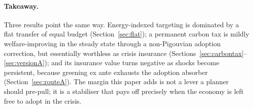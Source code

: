 \paragraph{Takeaway.} Three results point the same way. Energy-indexed targeting
is dominated by a flat transfer of equal budget (Section~\ref{sec:flat}); a
permanent carbon tax is mildly welfare-improving in the steady state through a
non-Pigouvian adoption correction, but essentially worthless as crisis insurance
(Sections~\ref{sec:carbontax}--\ref{sec:versionA}); and its insurance value turns
negative as shocks become persistent, because greening ex ante exhausts the
adoption absorber (Section~\ref{sec:routeA}). The margin this paper adds is not a
lever a planner should pre-pull; it is a stabiliser that pays off precisely when
the economy is left free to adopt in the crisis.
